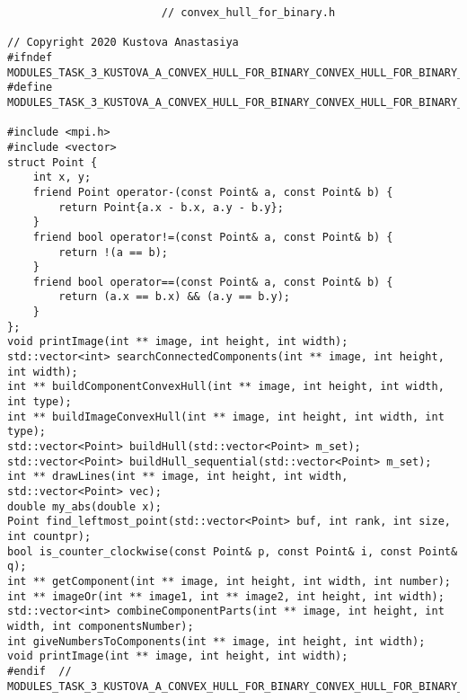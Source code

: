 \documentclass{report}
\begin{document}
\begin{lstlisting}
						// convex_hull_for_binary.h

// Copyright 2020 Kustova Anastasiya
#ifndef MODULES_TASK_3_KUSTOVA_A_CONVEX_HULL_FOR_BINARY_CONVEX_HULL_FOR_BINARY_H_
#define MODULES_TASK_3_KUSTOVA_A_CONVEX_HULL_FOR_BINARY_CONVEX_HULL_FOR_BINARY_H_

#include <mpi.h>
#include <vector>
struct Point {
    int x, y;
    friend Point operator-(const Point& a, const Point& b) {
        return Point{a.x - b.x, a.y - b.y};
    }
    friend bool operator!=(const Point& a, const Point& b) {
        return !(a == b);
    }
    friend bool operator==(const Point& a, const Point& b) {
        return (a.x == b.x) && (a.y == b.y);
    }
};
void printImage(int ** image, int height, int width);
std::vector<int> searchConnectedComponents(int ** image, int height, int width);
int ** buildComponentConvexHull(int ** image, int height, int width, int type);
int ** buildImageConvexHull(int ** image, int height, int width, int type);
std::vector<Point> buildHull(std::vector<Point> m_set);
std::vector<Point> buildHull_sequential(std::vector<Point> m_set);
int ** drawLines(int ** image, int height, int width, std::vector<Point> vec);
double my_abs(double x);
Point find_leftmost_point(std::vector<Point> buf, int rank, int size, int countpr);
bool is_counter_clockwise(const Point& p, const Point& i, const Point& q);
int ** getComponent(int ** image, int height, int width, int number);
int ** imageOr(int ** image1, int ** image2, int height, int width);
std::vector<int> combineComponentParts(int ** image, int height, int width, int componentsNumber);
int giveNumbersToComponents(int ** image, int height, int width);
void printImage(int ** image, int height, int width);
#endif  // MODULES_TASK_3_KUSTOVA_A_CONVEX_HULL_FOR_BINARY_CONVEX_HULL_FOR_BINARY_H_
\end{lstlisting}
\end{document}
